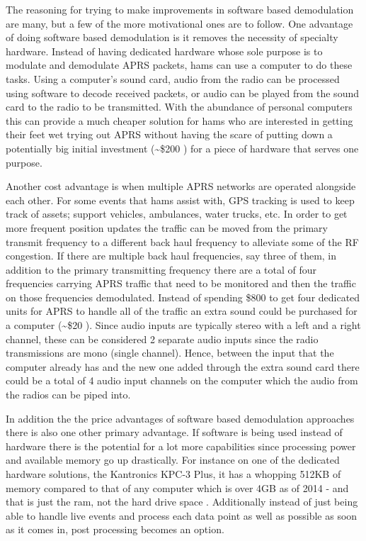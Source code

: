 The reasoning for trying to make improvements in software based demodulation are many, but a few of the more motivational ones are to follow. One advantage of doing software based demodulation is it removes the necessity of specialty hardware. Instead of having dedicated hardware whose sole purpose is to modulate and demodulate APRS packets, hams can use a computer to do these tasks. Using a computer's sound card, audio from the radio can be processed using software to decode received packets, or audio can be played from the sound card to the radio to be transmitted. With the abundance of personal computers this can provide a much cheaper solution for hams who are interested in getting their feet wet trying out APRS without having the scare of putting down a potentially big initial investment (\textasciitilde\$200 \cite{Kantronics2014,Outlet2014}) for a piece of hardware that serves one purpose.

Another cost advantage is when multiple APRS networks are operated alongside each other. For some events that hams assist with, GPS tracking is used to keep track of assets; support vehicles, ambulances, water trucks, etc. In order to get more frequent position updates the traffic can be moved from the primary transmit frequency to a different back haul frequency to alleviate some of the RF congestion. If there are multiple back haul frequencies, say three of them, in addition to the primary transmitting frequency there are a total of four frequencies carrying APRS traffic that need to be monitored and then the traffic on those frequencies demodulated. Instead of spending \$800 to get four dedicated units for APRS to handle all of the traffic an extra sound could be purchased for a computer (\textasciitilde\$20 \cite{Newegg}). Since audio inputs are typically stereo with a left and a right channel, these can be considered 2 separate audio inputs since the radio transmissions are mono (single channel). Hence, between the input that the computer already has and the new one added through the extra sound card there could be a total of 4 audio input channels on the computer which the audio from the radios can be piped into.

In addition the the price advantages of software based demodulation approaches there is also one other primary advantage. If software is being used instead of hardware there is the potential for a lot more capabilities since processing power and available memory go up drastically. For instance on one of the dedicated hardware solutions, the Kantronics KPC-3 Plus, it has a whopping 512KB of memory compared to that of any computer which is over 4GB as of 2014 - and that is just the ram, not the hard drive space \cite{Kantronics2014,Graham-Smith2014}. Additionally instead of just being able to handle live events and process each data point as well as possible as soon as it comes in, post processing becomes an option.

